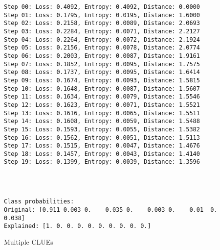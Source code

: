 \documentclass[11pt]{article}
\begin{document}
    \begin{Verbatim}[commandchars=\\\{\}]
Step 00: Loss: 0.4092, Entropy: 0.4092, Distance: 0.0000
Step 01: Loss: 0.1795, Entropy: 0.0195, Distance: 1.6000
Step 02: Loss: 0.2158, Entropy: 0.0089, Distance: 2.0693
Step 03: Loss: 0.2284, Entropy: 0.0071, Distance: 2.2127
Step 04: Loss: 0.2264, Entropy: 0.0072, Distance: 2.1924
Step 05: Loss: 0.2156, Entropy: 0.0078, Distance: 2.0774
Step 06: Loss: 0.2003, Entropy: 0.0087, Distance: 1.9161
Step 07: Loss: 0.1852, Entropy: 0.0095, Distance: 1.7575
Step 08: Loss: 0.1737, Entropy: 0.0095, Distance: 1.6414
Step 09: Loss: 0.1674, Entropy: 0.0093, Distance: 1.5815
Step 10: Loss: 0.1648, Entropy: 0.0087, Distance: 1.5607
Step 11: Loss: 0.1634, Entropy: 0.0079, Distance: 1.5546
Step 12: Loss: 0.1623, Entropy: 0.0071, Distance: 1.5521
Step 13: Loss: 0.1616, Entropy: 0.0065, Distance: 1.5511
Step 14: Loss: 0.1608, Entropy: 0.0059, Distance: 1.5488
Step 15: Loss: 0.1593, Entropy: 0.0055, Distance: 1.5382
Step 16: Loss: 0.1562, Entropy: 0.0051, Distance: 1.5113
Step 17: Loss: 0.1515, Entropy: 0.0047, Distance: 1.4676
Step 18: Loss: 0.1457, Entropy: 0.0043, Distance: 1.4140
Step 19: Loss: 0.1399, Entropy: 0.0039, Distance: 1.3596
    \end{Verbatim}

    \begin{center}
    \end{center}
    { \hspace*{\fill} \\}
    
    \begin{Verbatim}[commandchars=\\\{\}]

Class probabilities:
Original: [0.911 0.003 0.    0.035 0.    0.003 0.    0.01  0.    0.038]
Explained: [1. 0. 0. 0. 0. 0. 0. 0. 0. 0.]
    \end{Verbatim}

    Multiple CLUEs
\end{document}
